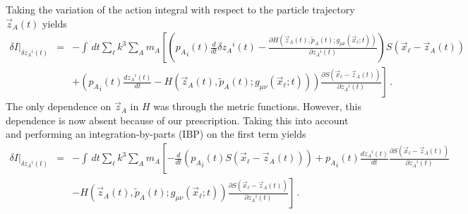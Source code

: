 Taking the variation of the action integral with respect to 
the particle trajectory $\vec z_A(t)$ yields
\begin{eqnarray*}
  \delta I \vert_{\delta {z_A}^i(t)} & = & - \int \, dt \sum _{\ell} k^3 \sum _{A} m_A
                                      \left[
                                        \left(
										  {p_A}_i(t)
										  \frac{ d }{d t}
										  \delta{z_A}^i(t)
										 -\frac{ \partial H(\vec z_A(t),
										                    \tilde p_A(t);
                                                            g_{\mu\nu}(\vec x_{\ell};t)) }
											   { \partial {z_A}^i(t)}
										\right)											   
										S({\vec x}_{\ell} - {\vec z}_A(t)) \right. \\
								&  & \left.
                                      + \left(
									      {p_A}_i(t)
										  \frac{ d {z_A}^i(t) }{d t}
										  - H(\vec z_A(t),
    						                  \tilde p_A(t);
                                              g_{\mu\nu}(\vec x_{\ell};t))
									    \right)						
										\frac{ \partial
										       S({\vec x}_{\ell} - {\vec z}_A(t))
											 }
											 { \partial {z_A}^i(t)}
                                     \right] \, . 				   			
\end{eqnarray*}
The only dependence on $\vec z_A$ in $H$ was through the metric functions.
However, this dependence is now absent because of our prescription.
Taking this into account and performing an integration-by-parts (IBP)
on the first term yields 
\begin{eqnarray*}
  \delta I \vert_{\delta {z_A}^i(t)} & = & - \int \, dt \sum _{\ell} k^3 \sum _{A} m_A
                                      \left[
     	  							   -\frac{ d }{d t}									  
                                       \left(
										  {p_A}_i(t)
   										  S({\vec x}_{\ell} - {\vec z}_A(t)) 
									   \right)
									  + 
  								      {p_A}_i(t)
									  \frac{ d {z_A}^i(t) }{d t}
   									  \frac{ \partial
										      S({\vec x}_{\ell} - {\vec z}_A(t))
										   }
										   { \partial {z_A}^i(t)} \right. \\
				                        &  & \left.
										  - H(\vec z_A(t),
    						                  \tilde p_A(t);
                                              g_{\mu\nu}(\vec x_{\ell};t))
									  \frac{ \partial
										     S({\vec x}_{\ell} - {\vec z}_A(t))
										   }
										   { \partial {z_A}^i(t)}
                                     \right] \, . 				   			
\end{eqnarray*}
